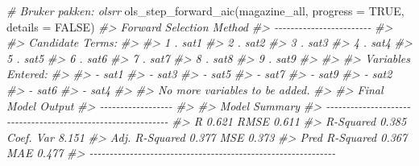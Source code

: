 \documentclass[
]{article}
\newenvironment{Shaded}{\begin{snugshade}}{\end{snugshade}}
\newcommand{\AttributeTok}[1]{\textcolor[rgb]{0.77,0.63,0.00}{#1}}
\newcommand{\CommentTok}[1]{\textcolor[rgb]{0.56,0.35,0.01}{\textit{#1}}}
\newcommand{\ConstantTok}[1]{\textcolor[rgb]{0.00,0.00,0.00}{#1}}
\newcommand{\FunctionTok}[1]{\textcolor[rgb]{0.00,0.00,0.00}{#1}}
\newcommand{\NormalTok}[1]{#1}
\begin{document}
\begin{Shaded}
\begin{Highlighting}[]
\CommentTok{\# Bruker pakken: olsrr}
\FunctionTok{ols\_step\_forward\_aic}\NormalTok{(magazine\_all, }\AttributeTok{progress =} \ConstantTok{TRUE}\NormalTok{, }\AttributeTok{details =} \ConstantTok{FALSE}\NormalTok{)}
\CommentTok{\#\textgreater{} Forward Selection Method }
\CommentTok{\#\textgreater{} {-}{-}{-}{-}{-}{-}{-}{-}{-}{-}{-}{-}{-}{-}{-}{-}{-}{-}{-}{-}{-}{-}{-}{-}}
\CommentTok{\#\textgreater{} }
\CommentTok{\#\textgreater{} Candidate Terms: }
\CommentTok{\#\textgreater{} }
\CommentTok{\#\textgreater{} 1 . sat1 }
\CommentTok{\#\textgreater{} 2 . sat2 }
\CommentTok{\#\textgreater{} 3 . sat3 }
\CommentTok{\#\textgreater{} 4 . sat4 }
\CommentTok{\#\textgreater{} 5 . sat5 }
\CommentTok{\#\textgreater{} 6 . sat6 }
\CommentTok{\#\textgreater{} 7 . sat7 }
\CommentTok{\#\textgreater{} 8 . sat8 }
\CommentTok{\#\textgreater{} 9 . sat9 }
\CommentTok{\#\textgreater{} }
\CommentTok{\#\textgreater{} }
\CommentTok{\#\textgreater{} Variables Entered: }
\CommentTok{\#\textgreater{} }
\CommentTok{\#\textgreater{} {-} sat1 }
\CommentTok{\#\textgreater{} {-} sat3 }
\CommentTok{\#\textgreater{} {-} sat5 }
\CommentTok{\#\textgreater{} {-} sat7 }
\CommentTok{\#\textgreater{} {-} sat9 }
\CommentTok{\#\textgreater{} {-} sat2 }
\CommentTok{\#\textgreater{} {-} sat6 }
\CommentTok{\#\textgreater{} {-} sat4 }
\CommentTok{\#\textgreater{} }
\CommentTok{\#\textgreater{} No more variables to be added.}
\CommentTok{\#\textgreater{} }
\CommentTok{\#\textgreater{} Final Model Output }
\CommentTok{\#\textgreater{} {-}{-}{-}{-}{-}{-}{-}{-}{-}{-}{-}{-}{-}{-}{-}{-}{-}{-}}
\CommentTok{\#\textgreater{} }
\CommentTok{\#\textgreater{}                         Model Summary                         }
\CommentTok{\#\textgreater{} {-}{-}{-}{-}{-}{-}{-}{-}{-}{-}{-}{-}{-}{-}{-}{-}{-}{-}{-}{-}{-}{-}{-}{-}{-}{-}{-}{-}{-}{-}{-}{-}{-}{-}{-}{-}{-}{-}{-}{-}{-}{-}{-}{-}{-}{-}{-}{-}{-}{-}{-}{-}{-}{-}{-}{-}{-}{-}{-}{-}{-}}
\CommentTok{\#\textgreater{} R                       0.621       RMSE               0.611 }
\CommentTok{\#\textgreater{} R{-}Squared               0.385       Coef. Var          8.151 }
\CommentTok{\#\textgreater{} Adj. R{-}Squared          0.377       MSE                0.373 }
\CommentTok{\#\textgreater{} Pred R{-}Squared          0.367       MAE                0.477 }
\CommentTok{\#\textgreater{} {-}{-}{-}{-}{-}{-}{-}{-}{-}{-}{-}{-}{-}{-}{-}{-}{-}{-}{-}{-}{-}{-}{-}{-}{-}{-}{-}{-}{-}{-}{-}{-}{-}{-}{-}{-}{-}{-}{-}{-}{-}{-}{-}{-}{-}{-}{-}{-}{-}{-}{-}{-}{-}{-}{-}{-}{-}{-}{-}{-}{-}}

\end{Highlighting}
\end{Shaded}
\end{document}
